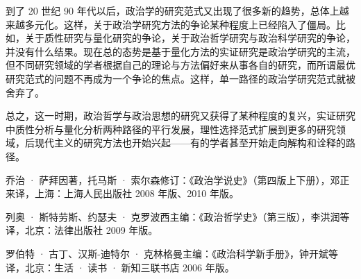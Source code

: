 到了 20 世纪 90 年代以后，政治学的研究范式又出现了很多新的趋势，总体上越来越多元化。这样，关于政治学研究方法的争论某种程度上已经陷入了僵局。比如，关于质性研究与量化研究的争论，关于政治哲学研究与政治科学研究的争论，并没有什么结果。现在总的态势是基于量化方法的实证研究是政治学研究的主流，但不同研究领域的学者根据自己的理论与方法偏好来从事各自的研究，而所谓最优研究范式的问题不再成为一个争论的焦点。这样，单一路径的政治学研究范式就被舍弃了。

总之，这一时期，政治哲学与政治思想的研究又获得了某种程度的复兴，实证研究中质性分析与量化分析两种路径的平行发展，理性选择范式扩展到更多的研究领域，后现代主义的研究方法也开始兴起——有的学者甚至开始走向解构和诠释的路径。


乔治 · 萨拜因著，托马斯 · 索尔森修订：《政治学说史》（第四版上下册），邓正来译，上海：上海人民出版社 2008 年版、2010 年版。

列奥 · 斯特劳斯、约瑟夫 · 克罗波西主编：《政治哲学史》（第三版），李洪润等译，北京：法律出版社 2009 年版。

罗伯特 · 古丁、汉斯-迪特尔 · 克林格曼主编：《政治科学新手册》，钟开斌等译，北京：生活 · 读书 · 新知三联书店 2006 年版。
